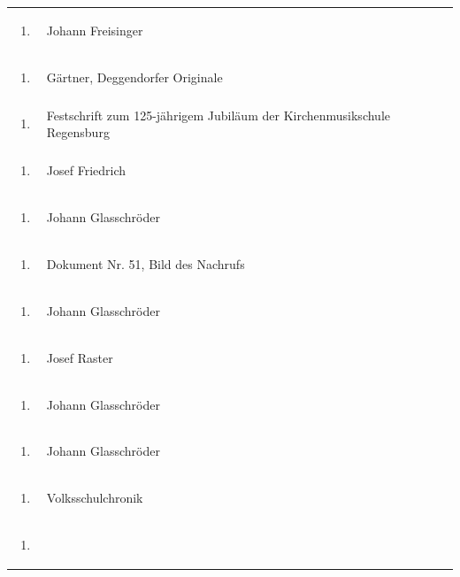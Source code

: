 \documentclass[a4paper]{article}
\begin{document}
\begin{flushleft}
\begin{supertabular}{m{1.2409999cm}m{14.604cm}}
\begin{enumerate}
\item
\end{enumerate}
 &
Johann Freisinger\\
\begin{enumerate}
\item
\end{enumerate}
 &
Gärtner, Deggendorfer Originale\\
\begin{enumerate}
\item
\end{enumerate}
 &
Festschrift zum 125-jährigem Jubiläum der Kirchenmusikschule
Regensburg\\
\begin{enumerate}
\item
\end{enumerate}
 &
Josef Friedrich\\
\begin{enumerate}
\item
\end{enumerate}
 &
Johann Glasschröder\\
\begin{enumerate}
\item
\end{enumerate}
 &
Dokument Nr. 51, Bild des Nachrufs\\
\begin{enumerate}
\item
\end{enumerate}
 &
Johann Glasschröder\\
\begin{enumerate}
\item
\end{enumerate}
 &
Josef Raster\\
\begin{enumerate}
\item
\end{enumerate}
 &
Johann Glasschröder\\
\begin{enumerate}
\item
\end{enumerate}
 &
Johann Glasschröder\\
\begin{enumerate}
\item
\end{enumerate}
 &
Volksschulchronik\\
\begin{enumerate}
\item

\end{enumerate}
\end{supertabular}
\end{flushleft}
\end{document}

